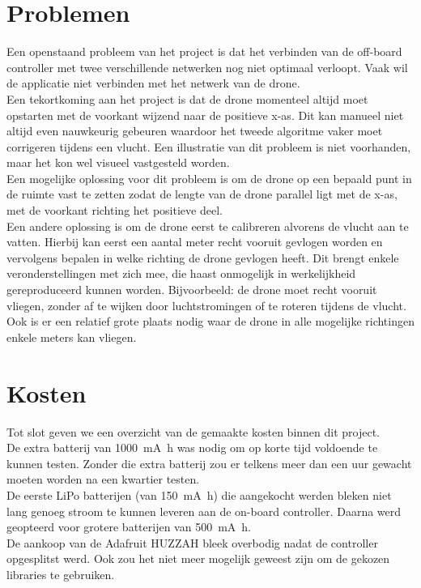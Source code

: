 \section{Problemen} \label{sec:problems}
Een openstaand probleem van het project is dat het verbinden van de off-board controller met twee verschillende netwerken nog niet optimaal verloopt. Vaak wil de applicatie niet verbinden met het netwerk van de drone.\\

Een tekortkoming aan het project is dat de drone momenteel altijd moet opstarten met de voorkant wijzend naar de positieve x-as.
Dit kan manueel niet altijd even nauwkeurig gebeuren waardoor het tweede algoritme vaker moet corrigeren tijdens een vlucht.
Een illustratie van dit probleem is niet voorhanden, maar het kon wel visueel vastgesteld worden.\\

Een mogelijke oplossing voor dit probleem is om de drone op een bepaald punt in de ruimte vast te zetten zodat de lengte van de drone parallel ligt met de x-as, met de voorkant richting het positieve deel.\\
Een andere oplossing is om de drone eerst te calibreren alvorens de vlucht aan te vatten.
Hierbij kan eerst een aantal meter recht vooruit gevlogen worden en vervolgens bepalen in welke richting de drone gevlogen heeft.
Dit brengt enkele veronderstellingen met zich mee, die haast onmogelijk in werkelijkheid gereproduceerd kunnen worden.
Bijvoorbeeld: de drone moet recht vooruit vliegen, zonder af te wijken door luchtstromingen of te roteren tijdens de vlucht.
Ook is er een relatief grote plaats nodig waar de drone in alle mogelijke richtingen enkele meters kan vliegen.\\

\section{Kosten}
Tot slot geven we een overzicht van de gemaakte kosten binnen dit project.\\
De extra batterij van \SI{1000}{\mA\hour} was nodig om op korte tijd voldoende te kunnen testen. Zonder die extra batterij zou er telkens meer dan een uur gewacht moeten worden na een kwartier testen.\\
De eerste LiPo batterijen (van \SI{150}{\mA\hour}) die aangekocht werden bleken niet lang genoeg stroom te kunnen leveren aan de on-board controller. Daarna werd geopteerd voor grotere batterijen van \SI{500}{\mA\hour}.\\
De aankoop van de Adafruit HUZZAH bleek overbodig nadat de controller opgesplitst werd. Ook zou het niet meer mogelijk geweest zijn om de gekozen libraries te gebruiken.\\


